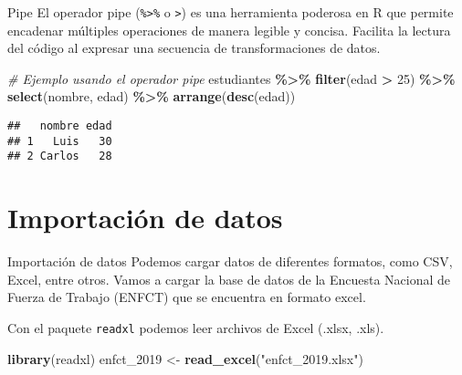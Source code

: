 \documentclass[
  ignorenonframetext,
]{beamer}
\newenvironment{Shaded}{\begin{snugshade}}{\end{snugshade}}
\newcommand{\CommentTok}[1]{\textcolor[rgb]{0.56,0.35,0.01}{\textit{#1}}}
\newcommand{\DecValTok}[1]{\textcolor[rgb]{0.00,0.00,0.81}{#1}}
\newcommand{\FunctionTok}[1]{\textcolor[rgb]{0.13,0.29,0.53}{\textbf{#1}}}
\newcommand{\NormalTok}[1]{#1}
\newcommand{\OtherTok}[1]{\textcolor[rgb]{0.56,0.35,0.01}{#1}}
\newcommand{\SpecialCharTok}[1]{\textcolor[rgb]{0.81,0.36,0.00}{\textbf{#1}}}
\newcommand{\StringTok}[1]{\textcolor[rgb]{0.31,0.60,0.02}{#1}}
\begin{document}
\begin{frame}[fragile]{Pipe}
\label{pipe}
El operador pipe (\texttt{\%\textgreater{}\%} o
\texttt{\textbar{}\textgreater{}}) es una herramienta poderosa en R que
permite encadenar múltiples operaciones de manera legible y concisa.
Facilita la lectura del código al expresar una secuencia de
transformaciones de datos.

\begin{Shaded}
\begin{Highlighting}[]
\CommentTok{\# Ejemplo usando el operador pipe}
\NormalTok{estudiantes }\SpecialCharTok{\%\textgreater{}\%}
  \FunctionTok{filter}\NormalTok{(edad }\SpecialCharTok{\textgreater{}} \DecValTok{25}\NormalTok{) }\SpecialCharTok{\%\textgreater{}\%}
  \FunctionTok{select}\NormalTok{(nombre, edad) }\SpecialCharTok{\%\textgreater{}\%}
  \FunctionTok{arrange}\NormalTok{(}\FunctionTok{desc}\NormalTok{(edad))}
\end{Highlighting}
\end{Shaded}

\begin{verbatim}
##   nombre edad
## 1   Luis   30
## 2 Carlos   28
\end{verbatim}
\end{frame}

\section{Importación de datos}\label{importaciuxf3n-de-datos}

\begin{frame}[fragile]{Importación de datos}
\label{importaciuxf3n-de-datos-1}
Podemos cargar datos de diferentes formatos, como CSV, Excel, entre
otros. Vamos a cargar la base de datos de la Encuesta Nacional de Fuerza
de Trabajo (ENFCT) que se encuentra en formato excel.

Con el paquete \texttt{readxl} podemos leer archivos de Excel (.xlsx,
.xls).

\begin{Shaded}
\begin{Highlighting}[]
\FunctionTok{library}\NormalTok{(readxl)}
\NormalTok{enfct\_2019 }\OtherTok{\textless{}{-}} \FunctionTok{read\_excel}\NormalTok{(}\StringTok{"enfct\_2019.xlsx"}\NormalTok{)}
\end{Highlighting}
\end{Shaded}
\end{frame}
\end{document}
